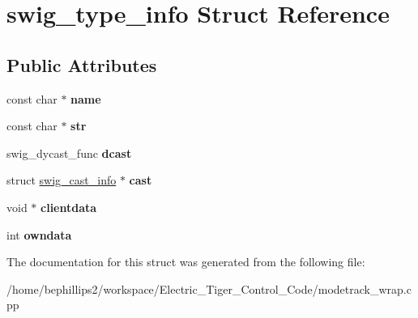 \hypertarget{structswig__type__info}{\section{swig\-\_\-type\-\_\-info Struct Reference}
\label{structswig__type__info}
}
\subsection*{Public Attributes}
\begin{DoxyCompactItemize}
\item 
\hypertarget{structswig__type__info_a90a9c6a25aa3e923978005ecbe23ad60}{const char $\ast$ {\bfseries name}}\label{structswig__type__info_a90a9c6a25aa3e923978005ecbe23ad60}

\item 
\hypertarget{structswig__type__info_abbe7cc58a083feb4329b748643324064}{const char $\ast$ {\bfseries str}}\label{structswig__type__info_abbe7cc58a083feb4329b748643324064}

\item 
\hypertarget{structswig__type__info_a07df4bedf85be77b23756b531b60e0dd}{swig\-\_\-dycast\-\_\-func {\bfseries dcast}}\label{structswig__type__info_a07df4bedf85be77b23756b531b60e0dd}

\item 
\hypertarget{structswig__type__info_a3ee3f7ef20e965b6c798d79723a96f9b}{struct \hyperlink{structswig__cast__info}{swig\-\_\-cast\-\_\-info} $\ast$ {\bfseries cast}}\label{structswig__type__info_a3ee3f7ef20e965b6c798d79723a96f9b}

\item 
\hypertarget{structswig__type__info_a19bdd65dceb89cd54befd3ded06558b7}{void $\ast$ {\bfseries clientdata}}\label{structswig__type__info_a19bdd65dceb89cd54befd3ded06558b7}

\item 
\hypertarget{structswig__type__info_a93c25d5903cbfcb82208eea7227c32bd}{int {\bfseries owndata}}\label{structswig__type__info_a93c25d5903cbfcb82208eea7227c32bd}

\end{DoxyCompactItemize}


The documentation for this struct was generated from the following file\-:\begin{DoxyCompactItemize}
\item 
/home/bephillips2/workspace/\-Electric\-\_\-\-Tiger\-\_\-\-Control\-\_\-\-Code/modetrack\-\_\-wrap.\-cpp\end{DoxyCompactItemize}
